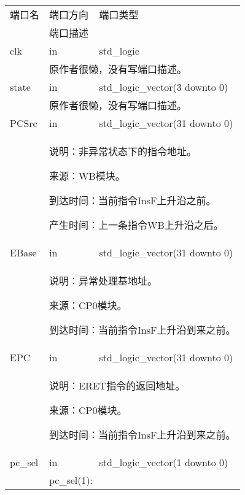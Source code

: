         \begin{tabularx}{\textwidth}{lll}
            \toprule
            端口名          & 端口方向  & 端口类型 \\
            \cmidrule(l){2-3}
            &
            \multicolumn{2}{X}{端口描述} \\
            \midrule
            clk             & in        & std\_logic \\
            \cmidrule(l){2-3}
            &
            \multicolumn{2}{X}{
                原作者很懒，没有写端口描述。
            } \\
            \midrule
            state           & in        & std\_logic\_vector(3 downto 0) \\
            \cmidrule(l){2-3}
            &
            \multicolumn{2}{X}{
                原作者很懒，没有写端口描述。
            } \\
            \midrule
            PCSrc           & in        & std\_logic\_vector(31 downto 0) \\
            \cmidrule(l){2-3}
            &
            \multicolumn{2}{X}{
                说明：非异常状态下的指令地址。

                来源：WB模块。

                到达时间：当前指令InsF上升沿之前。

                产生时间：上一条指令WB上升沿之后。
            } \\
            \midrule
            EBase           & in        & std\_logic\_vector(31 downto 0) \\
            \cmidrule(l){2-3}
            &
            \multicolumn{2}{X}{
                说明：异常处理基地址。

                来源：CP0模块。

                到达时间：当前指令InsF上升沿到来之前。
            } \\
            \midrule
            EPC             & in        & std\_logic\_vector(31 downto 0) \\
            \cmidrule(l){2-3}
            &
            \multicolumn{2}{X}{
                说明：ERET指令的返回地址。

                来源：CP0模块。

                到达时间：当前指令InsF上升沿到来之前。
            } \\
            \midrule
            pc\_sel         & in        & std\_logic\_vector(1 downto 0) \\
            \cmidrule(l){2-3}
            &
            \multicolumn{2}{X}{
                pc\_sel(1):

}
\end{tabularx}
